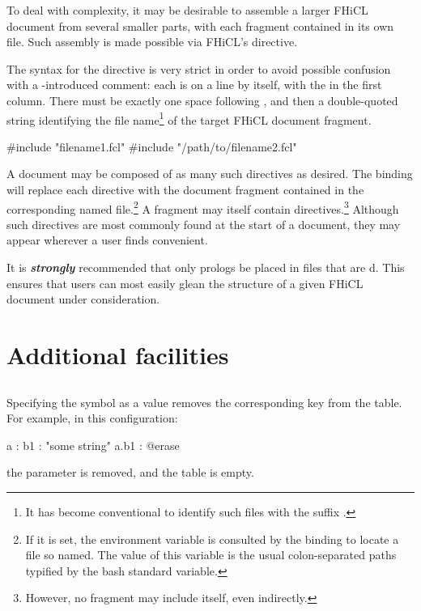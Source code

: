 \documentclass[draftmode,draftwater]{memarticle}
\makeatletter
\newcommand{\fhicl}{FHiCL\xspace}
\newcommand{\aterase}{\fclcode{@erase}\xspace}
\makeatother
\begin{document}
To deal with complexity, it may be desirable to assemble a larger
\fhicl document from several smaller parts, with each fragment
contained in its own file.  Such assembly is made possible via
\fhicl's  directive.

The syntax for the directive is very strict in order to avoid possible
confusion with a \fclcode{#}-introduced comment: each
 is on a line by itself, with the \fclcode{#} in the
first column.  There must be exactly one space following
, and then a double-quoted string identifying the
file name\footnote{%
  It has become conventional to identify such files with the suffix
  .%
} of the target \fhicl document fragment.  
%
\Needspace{0.34in}
\begin{fcllisting}[texcl,escapechar=`]
#include "filename1.fcl"
#include "/path/to/filename2.fcl"
\end{fcllisting}

A document may be composed of as many such directives as desired.  The
binding will replace each directive with the document fragment
contained in the corresponding named file.\footnote{%
  If it is set, the environment variable 
  is consulted by the binding to locate a file so named.  The value of
  this variable is the usual colon-separated paths typified by the
  bash standard  variable.%
} A fragment may itself contain 
directives.\footnote{%
  However, no fragment may include itself, even indirectly.%
} Although such directives are most commonly found at the start of a
document, they may appear wherever a user finds convenient.

\noindent It is \textbf{\textit{strongly}} recommended that only
prologs be placed in files that are d.  This ensures
that users can most easily glean the structure of a given FHiCL
document under consideration.

\chapter{Additional facilities}

\section{\aterase}

Specifying the \aterase symbol as a value removes the
corresponding key from the table.  For example, in this configuration:
\Needspace{0.34in}
\begin{fcllisting}[texcl,escapechar=`]
a : {
   b1 : "some string"
}
a.b1 : @erase
\end{fcllisting}
the parameter  is removed, and the table  is
empty.
\end{document}
